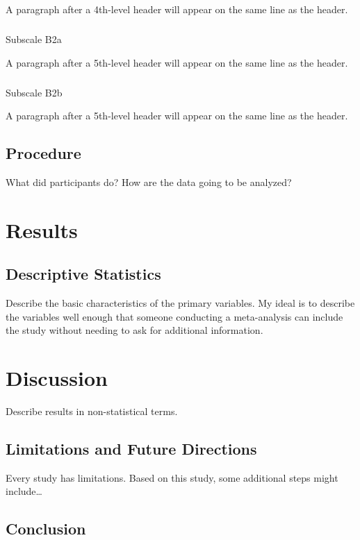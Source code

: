 \documentclass[
  letterpaper,
  DIV=11,
  numbers=noendperiod,
  oneside]{scrartcl}
\makeatletter
\let\oldsubparagraph\subparagraph
\renewcommand{\subparagraph}{
    \@ifstar
      \xxxSubParagraphStar
      \xxxSubParagraphNoStar
  }
\newcommand{\xxxSubParagraphStar}[1]{\oldsubparagraph*{#1}\mbox{}}
\newcommand{\xxxSubParagraphNoStar}[1]{\oldsubparagraph{#1}\mbox{}}
\makeatother
\begin{document}
A paragraph after a 4th-level header will appear on the same line as the
header.

\subparagraph{Subscale B2a}\label{subscale-b2a}

A paragraph after a 5th-level header will appear on the same line as the
header.

\subparagraph{Subscale B2b}\label{subscale-b2b}

A paragraph after a 5th-level header will appear on the same line as the
header.

\subsection{Procedure}\label{procedure}

What did participants do? How are the data going to be analyzed?

\section{Results}\label{results-1}

\subsection{Descriptive Statistics}\label{descriptive-statistics}

Describe the basic characteristics of the primary variables. My ideal is
to describe the variables well enough that someone conducting a
meta-analysis can include the study without needing to ask for
additional information.

\section{Discussion}\label{discussion}

Describe results in non-statistical terms.

\subsection{Limitations and Future
Directions}\label{limitations-and-future-directions}

Every study has limitations. Based on this study, some additional steps
might include\ldots{}

\subsection{Conclusion}\label{conclusion}
\end{document}
